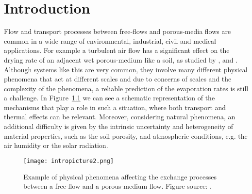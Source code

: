 \chapter{Introduction}
Flow and transport processes between free-flows and porous-media 
flows are common in a wide range of environmental, industrial, civil and medical 
applications.
For example a turbulent air flow has a significant effect on the 
drying rate of an adjacent wet porous-medium like a soil, as studied by  
\textcite{tesi:mosthaf}, \textcite{intro:davarzani} and \textcite  
{tesi:fetzer}.
Although systems like this are very common,	they involve
many different physical phenomena that act at 
different scales and
due to concerns of scales and the complexity of the phenomena,
a reliable prediction of the evaporation rates is still a challenge. In Figure~\ref{fig:intro} we can 
see a schematic representation of the mechanisms that play a role in such a 
situation, where both transport and thermal effects can be relevant. 
Moreover, considering natural phenomena, an additional difficulty is given by 
the intrinsic uncertainty and heterogeneity of material properties, such as the 
soil porosity, and atmospheric conditions, e.g. the air humidity or the 
solar radiation.
\begin{figure}[ht]
	\centering
	\texttt{[image: intropicture2.png]}
	\caption[Exchange processes between free and porous-medium 
	flows]{Example of physical phenomena affecting the exchange processes 
		between a free-flow and a porous-medium flow. Figure source: 
		\cite{tesi:fetzer}.}
	\label{fig:intro}
\end{figure}

